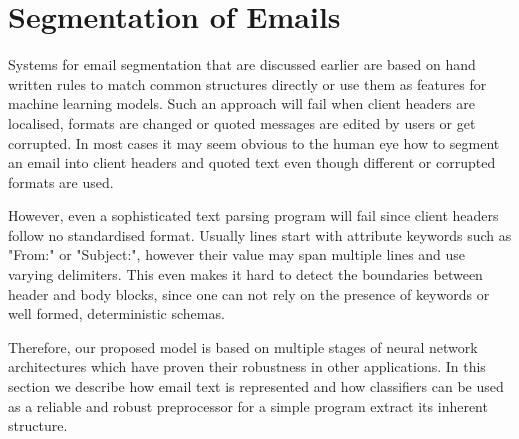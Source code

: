 \documentclass{llncs}
\begin{document}









\section{Segmentation of Emails}
\label{sec:model}
Systems for email segmentation that are discussed earlier are based on hand written rules to match common structures directly or use them as features for machine learning models.
Such an approach will fail when client headers are localised, formats are changed or quoted messages are edited by users or get corrupted.
In most cases it may seem obvious to the human eye how to segment an email into client headers and quoted text even though different or corrupted formats are used.

However, even a sophisticated text parsing program will fail since client headers follow no standardised format.
Usually lines start with attribute keywords such as "From:" or "Subject:", however their value may span multiple lines and use varying delimiters.
This even makes it hard to detect the boundaries between header and body blocks, since one can not rely on the presence of keywords or well formed, deterministic schemas.

Therefore, our proposed model is based on multiple stages of neural network architectures which have proven their robustness in other applications.
In this section we describe how email text is represented and how classifiers can be used as a reliable and robust preprocessor for a simple program extract its inherent structure.
\end{document}
